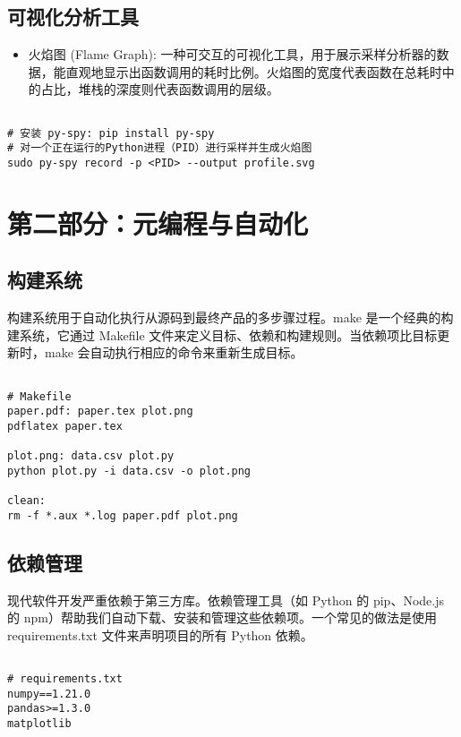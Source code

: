 \documentclass[UTF8]{gyh}
\begin{document}
\subsection{可视化分析工具}
\begin{itemize}
\item 火焰图 (Flame Graph): 一种可交互的可视化工具，用于展示采样分析器的数据，能直观地显示出函数调用的耗时比例。火焰图的宽度代表函数在总耗时中的占比，堆栈的深度则代表函数调用的层级。
\end{itemize}
\begin{lstlisting}

# 安装 py-spy: pip install py-spy
# 对一个正在运行的Python进程（PID）进行采样并生成火焰图
sudo py-spy record -p <PID> --output profile.svg
\end{lstlisting}

\section{第二部分：元编程与自动化}

\subsection{构建系统}
构建系统用于自动化执行从源码到最终产品的多步骤过程。make 是一个经典的构建系统，它通过 Makefile 文件来定义目标、依赖和构建规则。当依赖项比目标更新时，make 会自动执行相应的命令来重新生成目标。

\begin{lstlisting}

# Makefile
paper.pdf: paper.tex plot.png
pdflatex paper.tex

plot.png: data.csv plot.py
python plot.py -i data.csv -o plot.png

clean:
rm -f *.aux *.log paper.pdf plot.png
\end{lstlisting}

\subsection{依赖管理}
现代软件开发严重依赖于第三方库。依赖管理工具（如 Python 的 pip、Node.js 的 npm）帮助我们自动下载、安装和管理这些依赖项。一个常见的做法是使用 requirements.txt 文件来声明项目的所有 Python 依赖。

\begin{lstlisting}

# requirements.txt
numpy==1.21.0
pandas>=1.3.0
matplotlib
\end{lstlisting}
\end{document}
